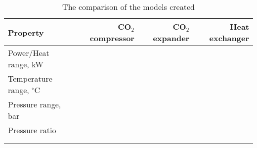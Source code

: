 \begin{table}
\label{tab:DiscussionComparison}
\caption{The comparison of the models created}
\begin{center}
\begin{tabulary}{0.9\textwidth}{LRRR}
\toprule
Property 	        &	CO$_2$ compressor & CO$_2$	expander & Heat exchanger \\
\midrule
Power/Heat range, kW& & & \\
Temperature range, $^\circ$C& & & \\
Pressure range, bar& & & \\
Pressure ratio& & & \\
& & & \\
& & & \\
\bottomrule
\end{tabulary}
\end{center}
\end{table}